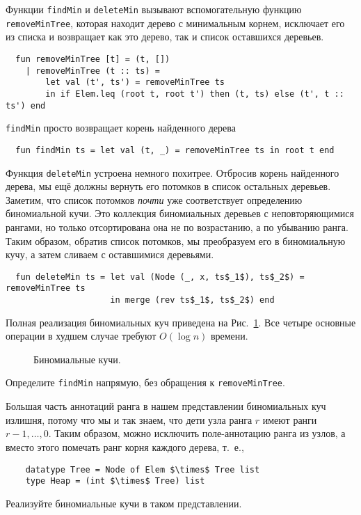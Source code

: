Функции \lstinline!findMin! и \lstinline!deleteMin! вызывают
вспомогательную функцию \lstinline!removeMinTree!, которая находит
дерево с минимальным корнем, исключает его из списка и возвращает как
это дерево, так и список оставшихся деревьев.
\begin{lstlisting}
  fun removeMinTree [t] = (t, [])
    | removeMinTree (t :: ts) = 
        let val (t', ts') = removeMinTree ts
        in if Elem.leq (root t, root t') then (t, ts) else (t', t :: ts') end
\end{lstlisting}
\lstinline!findMin! просто возвращает корень найденного дерева
\begin{lstlisting}
  fun findMin ts = let val (t, _) = removeMinTree ts in root t end
\end{lstlisting}
Функция \lstinline!deleteMin! устроена немного похитрее. Отбросив
корень найденного дерева, мы ещё должны вернуть его потомков в список
остальных деревьев. Заметим, что список потомков \emph{почти} уже
соответствует определению биномиальной кучи. Это коллекция
биномиальных деревьев с неповторяющимися рангами, но только
отсортирована она не по возрастанию, а по убыванию ранга. Таким
образом, обратив список потомков, мы преобразуем его в биномиальную
кучу, а затем сливаем с оставшимися деревьями.
\begin{lstlisting}
  fun deleteMin ts = let val (Node (_, x, ts$_1$), ts$_2$) = removeMinTree ts
                     in merge (rev ts$_1$, ts$_2$) end
\end{lstlisting}
Полная реализация биномиальных куч приведена на
Рис.~\ref{fig:3.4}. Все четыре основные операции в худшем случае
требуют $O(\log n)$ времени.

\begin{figure}
  \centering
  
  \caption{Биномиальные кучи.}
  \label{fig:3.4}
\end{figure}

\begin{exercise}\label{ex:3.5}
  Определите \lstinline!findMin! напрямую, без обращения к \lstinline!removeMinTree!.
\end{exercise}

\begin{exercise}\label{ex:3.6}
  Большая часть аннотаций ранга в нашем представлении биномиальных куч
  излишня, потому что мы и так знаем, что дети узла ранга $r$ имеют
  ранги $r-1, \ldots, 0$. Таким образом, можно исключить
  поле-аннотацию ранга из узлов, а вместо этого помечать ранг корня
  каждого дерева, т.~е.,
  \begin{lstlisting}
    datatype Tree = Node of Elem $\times$ Tree list
    type Heap = (int $\times$ Tree) list
  \end{lstlisting}
  Реализуйте биномиальные кучи в таком представлении.
\end{exercise}

